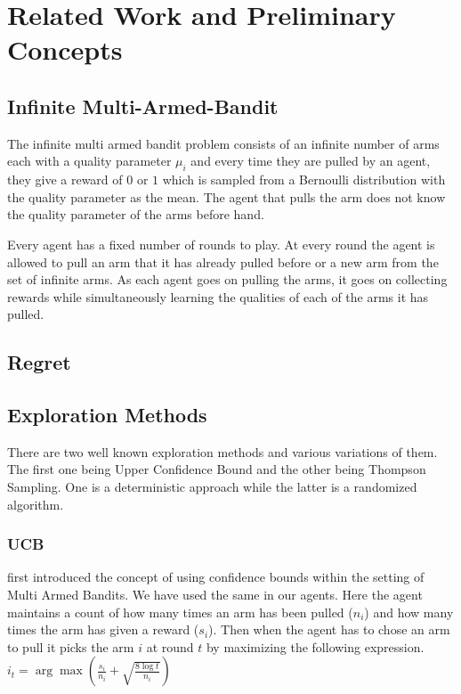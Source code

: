 \section{Related Work and Preliminary Concepts}

\subsection{Infinite Multi-Armed-Bandit}

The infinite multi armed bandit problem consists of an infinite number of arms each with a quality parameter $\mu_i$ and every time they are pulled by an agent, they give a reward of $0$ or $1$ which is sampled from a Bernoulli distribution with the quality parameter as the mean. The agent that pulls the arm does not know the quality parameter of the arms before hand.

Every agent has a fixed number of rounds to play. At every round the agent is allowed to pull an arm that it has already pulled before or a new arm from the set of infinite arms. As each agent goes on pulling the arms, it goes on collecting rewards while simultaneously learning the qualities of each of the arms it has pulled.

\subsection{Regret}

\begin{definition}
\end{definition}

\begin{definition}
    
\end{definition}

\subsection{Exploration Methods}
There are two well known exploration methods and various variations of them. The first one being Upper Confidence Bound and the other being Thompson Sampling. One is a deterministic approach while the latter is a randomized algorithm.
\subsubsection{UCB}
 first introduced the concept of using confidence bounds within the setting of Multi Armed Bandits. We have used the same in our agents. Here the agent maintains a count of how many times an arm has been pulled ($n_i$) and how many times the arm has given a reward ($s_i$). Then when the agent has to chose an arm to pull it picks the arm $i$ at round $t$ by maximizing the following expression. $i_t = \arg\max ( \frac{s_i}{n_i} + \sqrt{\frac{8\log t}{n_i} })$

